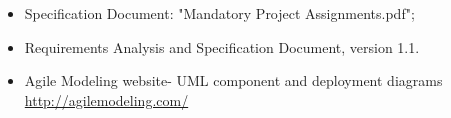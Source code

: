 \begin{itemize}
\item Specification Document: "Mandatory Project Assignments.pdf";
\item Requirements Analysis and Specification Document, version 1.1.
\item Agile Modeling website- UML component and deployment diagrams \url{http://agilemodeling.com/}
\end{itemize}